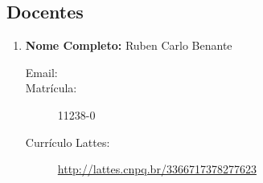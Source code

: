 \documentclass[a4paper,12pt]{article} %
\begin{document}
\begin{enumerate}
\end{enumerate}


\subsection*{Docentes}

\begin{enumerate}
    \item \textbf{Nome Completo:} Ruben Carlo Benante
    \begin{description}
        \item [Email:] 
        \item [Matrícula:] 11238-0
        \item [Currículo Lattes:] \url{http://lattes.cnpq.br/3366717378277623}
    \end{description}

\end{enumerate}


\end{document}
